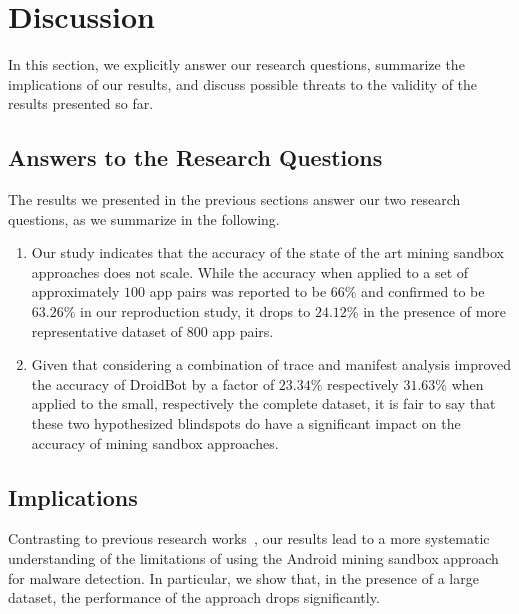 

\section{Discussion}

In this section, we explicitly answer our research questions,
summarize the implications of our results, and discuss possible
threats to the validity of the results presented so far.

\subsection{Answers to the Research Questions}

The results we presented in the previous sections
 answer our two research questions, as
we summarize in the following.

\begin{enumerate}[(RQ1)]
\item \textbf{\rqa} 
Our study indicates that the accuracy of the state of the art mining sandbox approaches does not scale.
While the accuracy when applied to a set of approximately $100$ app pairs
was reported to be $66\%$ and confirmed to be $63.26\%$ in our reproduction study, 
it drops to $24.12\%$ in the presence of more representative dataset of $800$ app pairs. 

 \item \textbf{\rqb} Given that considering a combination of trace and manifest analysis improved the accuracy of DroidBot by a factor of $23.34\%$ respectively $31.63\%$ when applied to the small, respectively the complete dataset, it is fair to say that these two hypothesized blindspots do have a significant impact on the accuracy of mining sandbox approaches. 
\end{enumerate}


\subsection{Implications}\label{sec:implications} 

Contrasting to previous research works~\cite{DBLP:conf/wcre/BaoLL18,DBLP:conf/iceccs/LeB0GL18,DBLP:journals/jss/CostaMMSSBNR22},
our results 
lead to a more systematic understanding
of the limitations of using the Android mining sandbox approach
for malware detection. In particular, we show that,
in the presence of a large dataset, the performance of the
approach drops significantly. 

